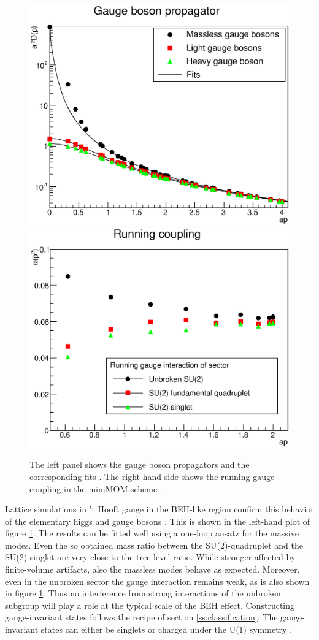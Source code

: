 \documentclass[final,twoside,12pt]{article}
\newcommand*{\1}{1\!\!\!\bot}
\begin{document}
\begin{figure}
\includegraphics[width=0.5\linewidth]{WPropV20}\includegraphics[width=0.5\linewidth]{alpha-gut}
\caption{\label{fig:gut}The left panel shows the gauge boson propagators and the corresponding fits \cite{Maas:2016ngo}. The right-hand side shows the running gauge coupling in the miniMOM scheme \cite{Maas:unpublishedtoerek}.}
\end{figure}

Lattice simulations in 't Hooft gauge in the BEH-like region confirm this behavior of the elementary higgs and gauge bosons \cite{Maas:2016ngo,Maas:unpublishedtoerek}. This is shown in the left-hand plot of figure \ref{fig:gut}. The results can be fitted well using a one-loop ansatz for the massive modes. Even the so obtained mass ratio between the SU(2)-quadruplet and the SU(2)-singlet are very close to the tree-level ratio. While stronger affected by finite-volume artifacts, also the massless modes behave as expected. Moreover, even in the unbroken sector the gauge interaction remains weak, as is also shown in figure \ref{fig:gut}. Thus no interference from strong interactions of the unbroken subgroup will play a role at the typical scale of the BEH effect. Constructing gauge-invariant states follows the recipe of section \ref{ss:classification}. The gauge-invariant states can either be singlets or charged under the U(1) symmetry \cite{Maas:2017xzh}.
\end{document}
